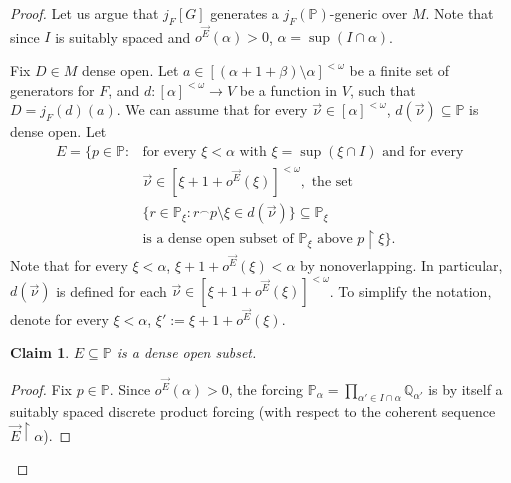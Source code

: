 \documentclass{article}
\theoremstyle{definition}
\theoremstyle{plain}
\newtheorem{claim}[definition]{Claim}
\newcommand{\po}{\mathbb{P}}
\newcommand{\qo}{\mathbb{Q}}
\newcommand{\uhr}{\upharpoonright}
\begin{document}
    \begin{proof}
        Let us argue that $j_F[G]$ generates a $j_F(\po)$-generic over $M$. Note that since $I$ is suitably spaced and $o^{\vec E}(\alpha)>0$, $\alpha = \sup(I\cap \alpha)$.
        
        Fix $D\in M$ dense open. Let $a\in [(\alpha+1+\beta)\setminus \alpha]^{<\omega}$ be a finite set of generators for $F$, and $d\colon [\alpha]^{<\omega}\to V$ be a function in $V$, such that $D = j_F(d)(a)$. We can assume that for every $\vec{\nu}\in [\alpha]^{<\omega}$, $d(\vec{\nu})\subseteq \po$ is dense open. Let
    \begin{align*}
        E = \{ p\in \po \colon &\text{for every }\xi<\alpha \text{ with }\xi= \sup(\xi\cap I) \text{ and for every }\\ &\vec{\nu}\in [ \xi+1+o^{\vec{E}}(\xi) ]^{<\omega}, \text{ the set}\\
        &\{ r\in \po_\xi \colon r{}^\frown p\setminus  \xi \in d(\vec{\nu})\}\subseteq \po_\xi\\
        &\text{is a dense open subset of }\po_{\xi} \text{ above } p\uhr \xi \}.
    \end{align*}
    Note that for every $\xi<\alpha$,  $\xi+1+o^{\vec{E}}(\xi)<\alpha$ by nonoverlapping. In particular, $d(\vec{\nu})$ is defined for each $\vec{\nu}\in [\xi+1+o^{\vec E}(\xi)]^{<\omega}$. To simplify the notation, denote for every $\xi<\alpha$, $\xi':=\xi+1+o^{\vec E}(\xi)$.
    
    \begin{claim}\label{Claim:TheSetE}
        $E\subseteq \po$ is a dense open subset.
    \end{claim}

    \begin{proof}
        Fix $p\in \po$. Since $o^{\vec{E}}(\alpha)>0$, the forcing $\po_\alpha = \prod_{\alpha'\in I\cap \alpha}\qo_{\alpha'}$ is by itself a suitably spaced discrete product forcing (with respect to the coherent sequence $\vec{E}\uhr \alpha$). 
        

\end{proof}
\end{proof}
\end{document}
